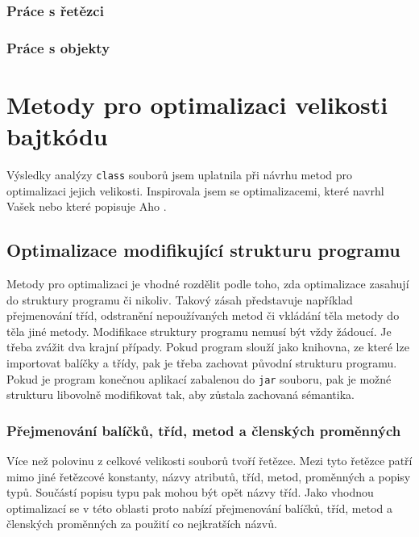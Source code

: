 \subsubsection{Práce s řetězci}


\subsubsection{Práce s objekty}

\section{Metody pro optimalizaci velikosti bajtkódu}\label{Analysis}

Výsledky analýzy \texttt{class} souborů jsem uplatnila při návrhu metod pro optimalizaci jejich velikosti. Inspirovala jsem se optimalizacemi, které navrhl Vašek \cite{TODO} nebo které popisuje Aho \cite{TODO}. 

\subsection{Optimalizace modifikující strukturu programu}

Metody pro optimalizaci je vhodné rozdělit podle toho, zda optimalizace zasahují do struktury programu či nikoliv. Takový zásah představuje například přejmenování tříd, odstranění nepoužívaných metod či vkládání těla metody do těla jiné metody.
Modifikace struktury programu nemusí být vždy žádoucí. Je třeba zvážit dva krajní případy. Pokud program slouží jako knihovna, ze které lze importovat balíčky a třídy, pak je třeba zachovat původní strukturu programu. Pokud je program konečnou aplikací zabalenou do \texttt{jar} souboru, pak je možné strukturu libovolně modifikovat tak, aby zůstala zachovaná sémantika.

\subsubsection{Přejmenování balíčků, tříd, metod a členských proměnných}
Více než polovinu z celkové velikosti souborů tvoří řetězce. Mezi tyto řetězce patří mimo jiné řetězcové konstanty, názvy atributů, tříd, metod, proměnných a popisy typů. Součástí popisu typu pak mohou být opět názvy tříd. Jako vhodnou optimalizací se v této oblasti proto nabízí přejmenování balíčků, tříd, metod a členských proměnných za použití co nejkratších názvů. 

